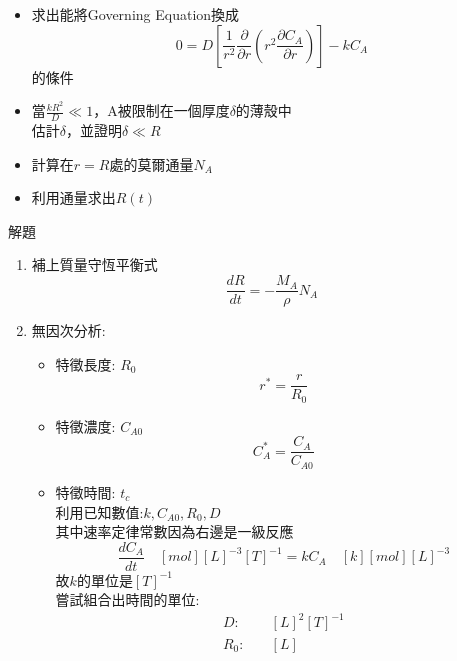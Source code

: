 \documentclass[../main.tex]{subfiles}
\begin{document}
\begin{itemize}
\begin{itemize}
    \begin{align}
      C_A(R(t), t) &= C_{A0}\\
      C_A(\infty, t) &= 0
    \end{align}
    \item 求出能將Governing Equation換成
    \begin{equation}
      0 = D\left[
        \frac{1}{r^2}\frac{\partial}{\partial r}\left(
          r^2\frac{\partial C_A}{\partial r}
        \right)
      \right] - k C_A
    \end{equation}
    的條件
    \item 當$\frac{kR^2}{D}\ll 1$，A被限制在一個厚度$\delta$的薄殼中\\
    估計$\delta$，並證明$\delta \ll R$
    \item 計算在$r=R$處的莫爾通量$N_A$
    \item 利用通量求出$R(t)$
  \end{itemize}
  解題
  \begin{enumerate}
    \item 補上質量守恆平衡式
    \begin{equation}
      \frac{dR}{dt} = -\frac{M_A}{\rho} N_A
    \end{equation}
    \item 無因次分析:
    \begin{itemize}
      \item 特徵長度: $R_0$
      \begin{equation}
        r^\ast = \frac{r}{R_0}
      \end{equation}
      \item 特徵濃度: $C_{A0}$
      \begin{equation}
        C_A^\ast = \frac{C_A}{C_{A0}}
      \end{equation}
      \item 特徵時間: $t_c$\\
      利用已知數值:$k,C_{A0},R_0,D$\\
      其中速率定律常數因為右邊是一級反應
      \begin{equation}
        \frac{dC_A}{dt} \quad [mol][L]^{-3}[T]^{-1} = k C_A \quad [k][mol][L]^{-3}
      \end{equation}
      故$k$的單位是$[T]^{-1}$\\
      嘗試組合出時間的單位:
      \begin{align}
        D: &\quad [L]^2[T]^{-1} \nonumber\\
        R_0: &\quad [L] \nonumber\\

\end{align}
\end{itemize}
\end{enumerate}
\end{itemize}
\end{document}
